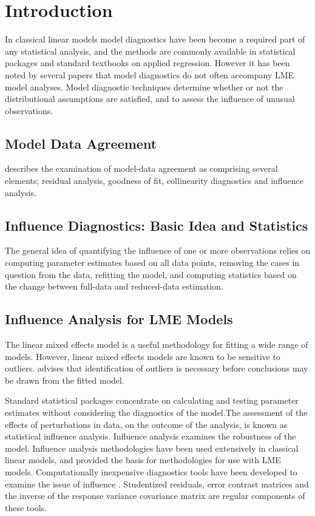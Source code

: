 \documentclass[12pt, a4paper]{article}
\begin{document}
	\section{Introduction}%
	In classical linear models model diagnostics have been become a required part of any statistical analysis, and the methods are commonly available in statistical packages and standard textbooks on applied regression. However it has been noted by several papers that model diagnostics do not often accompany LME model analyses.
	Model diagnostic techniques determine whether or not the distributional assumptions are satisfied, and to assess the influence of unusual observations.
	
	\subsection{Model Data Agreement} %
	\citet{schabenberger} describes the examination of model-data agreement as comprising several elements; residual analysis, goodness of fit, collinearity diagnostics and influence analysis.
	
	\subsection{Influence Diagnostics: Basic Idea and Statistics} %
	
	The general idea of quantifying the influence of one or more observations relies on computing parameter estimates based on all data points, removing the cases in question from the data, refitting the model, and computing statistics based on the change between full-data and reduced-data estimation. 
	
	
	
	\subsection{Influence Analysis for LME Models} %
	The linear mixed effects model is a useful methodology for fitting a wide range of models. However, linear mixed effects models are known to be sensitive to outliers. \citet{CPJ} advises that identification of outliers is necessary before conclusions may be drawn from the fitted model.
	
	Standard statistical packages concentrate on calculating and testing parameter estimates without considering the diagnostics of the model.The assessment of the effects of perturbations in data, on the outcome of the analysis, is known as statistical influence analysis. Influence analysis examines the robustness of the model. Influence analysis methodologies have been used extensively in classical linear models, and provided the basis for methodologies for use with LME models.
	Computationally inexpensive diagnostics tools have been developed to examine the issue of influence \citep{Zewotir}.
	Studentized residuals, error contrast matrices and the inverse of the response variance covariance matrix are regular components of these tools.
	
\end{document}
